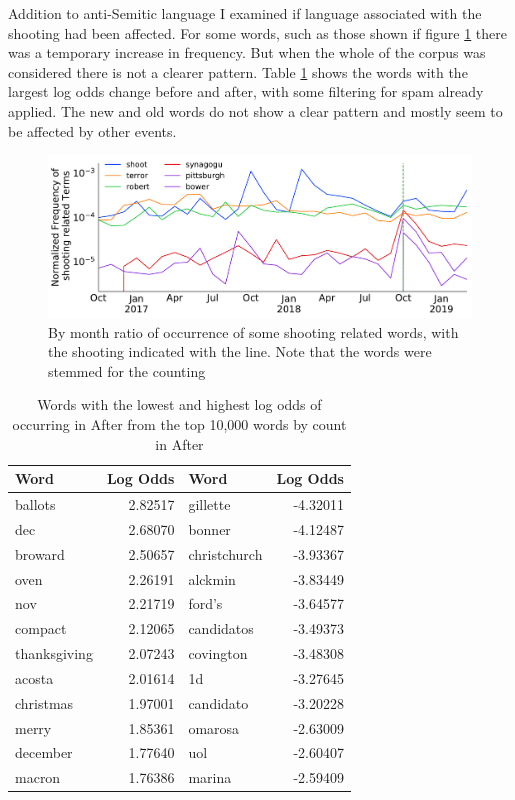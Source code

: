 \documentclass[letterpaper]{article}
\begin{document}
Addition to anti-Semitic language I examined if language associated with the shooting had been affected. For some words, such as those shown if figure \ref{shooting} there was a temporary increase in frequency. But when the whole of the corpus was considered there is not a clearer pattern. Table \ref{new_old} shows the words with the largest log odds change before and after, with some filtering for spam already applied. The new and old words do not show a clear pattern and mostly seem to be affected by other events. 


\begin{figure}[h!]
	\centering
	\includegraphics[width=1\textwidth]{overtime_shooting.pdf}
	\caption{By month ratio of occurrence of some shooting related words, with the shooting indicated with the  line. Note that the words were stemmed for the counting}\label{shooting}
\end{figure}

\begin{table}[h!]
	\centering
	\small
	\begin{tabular}{lr|lr}
		\toprule
		Word &  Log Odds &  Word  & Log Odds \\
		\midrule
		ballots         &   2.82517  &  gillette        &  -4.32011\\
		dec             &   2.68070  &  bonner          &  -4.12487\\
		broward         &   2.50657  &  christchurch    &  -3.93367\\
		oven            &   2.26191  &  alckmin         &  -3.83449\\
		nov             &   2.21719  &  ford’s          &  -3.64577\\
		compact         &   2.12065  &  candidatos      &  -3.49373\\
		thanksgiving    &   2.07243  &  covington       &  -3.48308\\
		acosta          &   2.01614  &  1d              &  -3.27645\\
		christmas       &   1.97001  &  candidato       &  -3.20228\\
		merry           &   1.85361  &  omarosa         &  -2.63009\\
		december        &   1.77640  &  uol             &  -2.60407\\
		macron          &   1.76386  &  marina          &  -2.59409\\
		\bottomrule
	\end{tabular}
	\caption{Words with the lowest and highest log odds of occurring in After from the top 10,000 words by count in After}\label{new_old}
\end{table}
\end{document}
